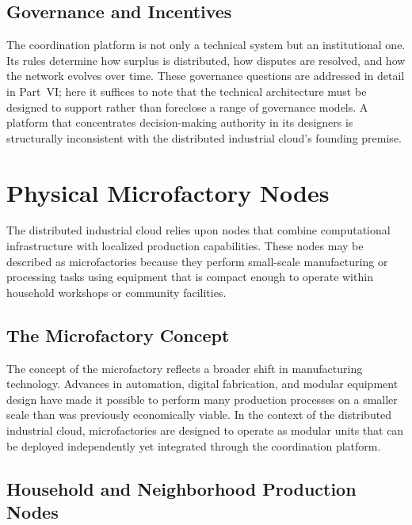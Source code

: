 \documentclass[12pt]{book}
\theoremstyle{definition}
\theoremstyle{remark}
\begin{document}
\section{Governance and Incentives}

The coordination platform is not only a technical system but an
institutional one. Its rules determine how surplus is distributed,
how disputes are resolved, and how the network evolves over time.
These governance questions are addressed in detail in Part~VI;
here it suffices to note that the technical architecture must be
designed to support rather than foreclose a range of governance
models. A platform that concentrates decision-making authority in
its designers is structurally inconsistent with the distributed
industrial cloud's founding premise.

\chapter{Physical Microfactory Nodes}

The distributed industrial cloud relies upon nodes that combine
computational infrastructure with localized production capabilities.
These nodes may be described as microfactories because they perform
small-scale manufacturing or processing tasks using equipment that is
compact enough to operate within household workshops or community
facilities.

\section{The Microfactory Concept}

The concept of the microfactory reflects a broader shift in
manufacturing technology. Advances in automation, digital
fabrication, and modular equipment design have made it possible to
perform many production processes on a smaller scale than was
previously economically viable. In the context of the distributed
industrial cloud, microfactories are designed to operate as modular
units that can be deployed independently yet integrated through
the coordination platform.

\section{Household and Neighborhood Production Nodes}
\end{document}
